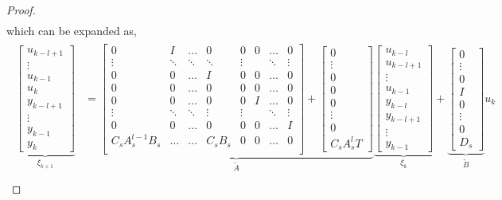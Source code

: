 \begin{proof}
\begin{align*}
\end{align*}
which can be expanded as,
\begin{align}
\begin{split}
\label{eq:extended_sys}
\underbrace{\begin{bmatrix} u_{k-l+1} \\ \vdots \\ u_{k-1} \\ u_{k} \\ y_{k-l+1} \\ \vdots \\ y_{k-1} \\ y_{k}  \end{bmatrix}}_{\xi_{k+1}} &= \underbrace{\begin{bmatrix} 
0 & I & \dots & 0 & 0 &  0& \dots &0 \\
\vdots & \ddots & \ddots&\ddots& \vdots & & \ddots&\vdots \\
0 & 0 & \dots & I & 0& 0&  \dots & 0 \\
0 & 0 & \dots & 0 & 0 & 0&  \dots & 0 \\
0 & 0 & \dots & 0 & 0& I& \dots &0 \\
\vdots & \ddots & \ddots&\vdots&\vdots & & \ddots&\vdots \\
0 & 0 & \dots & 0 & 0& 0&  \dots & I \\
C_sA_s^{l-1}B_s & \dots & \dots & C_sB_s & 0 & 0 & \dots &  0 \\
\end{bmatrix} + \begin{bmatrix} 0 \\ \vdots \\ 0\\ 0 \\ 0 \\ \vdots \\ 0 \\ C_s A_s^l T \end{bmatrix} }_{\widetilde{A}} \underbrace{\begin{bmatrix} u_{k-l} \\ u_{k-l+1} \\ \vdots \\ u_{k-1} \\ y_{k-l} \\ y_{k-l+1} \\ \vdots \\ y_{k-1} \end{bmatrix}}_{\xi_{k}} + \underbrace{\begin{bmatrix} 0 \\ \vdots \\ 0 \\ I \\ 0 \\ \vdots \\ 0 \\ D_s  \end{bmatrix}}_{\widetilde{B}} u_{k} \\

\end{split}
\end{align}
\end{proof}
